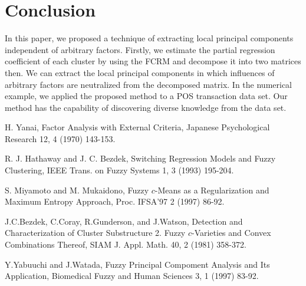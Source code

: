 \documentclass{article}
\begin{document}

\section{Conclusion}
In this paper, we proposed a technique of extracting local principal components independent of arbitrary factors. Firstly, we estimate the partial regression coefficient of each cluster by using the FCRM and decompose it into two matrices then. We can extract the local principal components in which influences of arbitrary factors are neutralized from the decomposed matrix. In the numerical example, we applied the proposed method to a POS transaction data set. Our method has the capability of discovering diverse knowledge from the data set.


\begin{thebibliography}{99}

H. Yanai, Factor Analysis with External Criteria, Japanese Psychological Research 12, 4 (1970) 143-153.

R. J. Hathaway and J. C. Bezdek, Switching Regression Models and Fuzzy Clustering, IEEE Trans. on Fuzzy Systems 1, 3 (1993) 195-204.

S. Miyamoto and M. Mukaidono, Fuzzy $c$-Means as a Regularization and Maximum Entropy Approach, Proc. IFSA'97 2 (1997) 86-92.

J.C.Bezdek, C.Coray, R.Gunderson, and J.Watson, Detection and Characterization of Cluster Substructure 2. Fuzzy $c$-Varieties and Convex Combinations Thereof, SIAM J. Appl. Math. 40, 2 (1981) 358-372.

Y.Yabuuchi and J.Watada, Fuzzy Principal Compoment Analysis and Its Application, Biomedical Fuzzy and Human Sciences 3, 1 (1997) 83-92.

\end{thebibliography}
\end{document}
